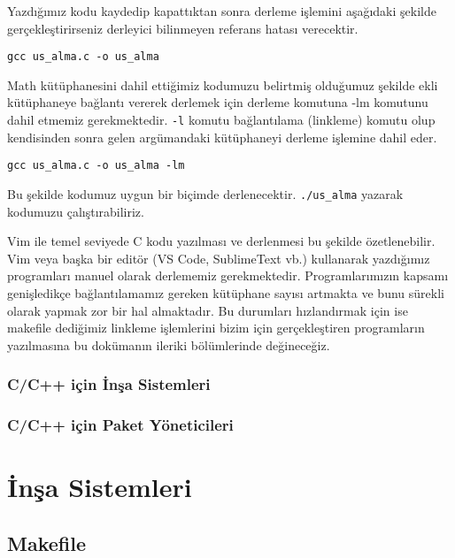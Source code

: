 \documentclass[
]{book}
\begin{document}
Yazdığımız kodu kaydedip kapattıktan sonra derleme işlemini aşağıdaki şekilde gerçekleştirirseniz derleyici bilinmeyen referans hatası verecektir.

\texttt{gcc\ us\_alma.c\ -o\ us\_alma}

Math kütüphanesini dahil ettiğimiz kodumuzu belirtmiş olduğumuz şekilde ekli kütüphaneye bağlantı vererek derlemek için derleme komutuna -lm komutunu dahil etmemiz gerekmektedir. \texttt{-l} komutu bağlantılama (linkleme) komutu olup kendisinden sonra gelen argümandaki kütüphaneyi derleme işlemine dahil eder.

\texttt{gcc\ us\_alma.c\ -o\ us\_alma\ -lm}

Bu şekilde kodumuz uygun bir biçimde derlenecektir. \texttt{./us\_alma} yazarak kodumuzu çalıştırabiliriz.

Vim ile temel seviyede C kodu yazılması ve derlenmesi bu şekilde özetlenebilir. Vim veya başka bir editör (VS Code, SublimeText vb.) kullanarak yazdığımız programları manuel olarak derlememiz gerekmektedir. Programlarımızın kapsamı genişledikçe bağlantılamamız gereken kütüphane sayısı artmakta ve bunu sürekli olarak yapmak zor bir hal almaktadır. Bu durumları hızlandırmak için ise makefile dediğimiz linkleme işlemlerini bizim için gerçekleştiren programların yazılmasına bu dokümanın ileriki bölümlerinde değineceğiz.

\hypertarget{cc-iuxe7in-inux15fa-sistemleri}{%
\section*{C/C++ için İnşa Sistemleri}\label{cc-iuxe7in-inux15fa-sistemleri}}

\hypertarget{cc-iuxe7in-paket-yuxf6neticileri}{%
\section*{C/C++ için Paket Yöneticileri}\label{cc-iuxe7in-paket-yuxf6neticileri}}

\hypertarget{part-inux15fa-sistemleri}{%
\part{İnşa Sistemleri}\label{part-inux15fa-sistemleri}}

\hypertarget{makefile}{%
\chapter{Makefile}\label{makefile}}
\end{document}
